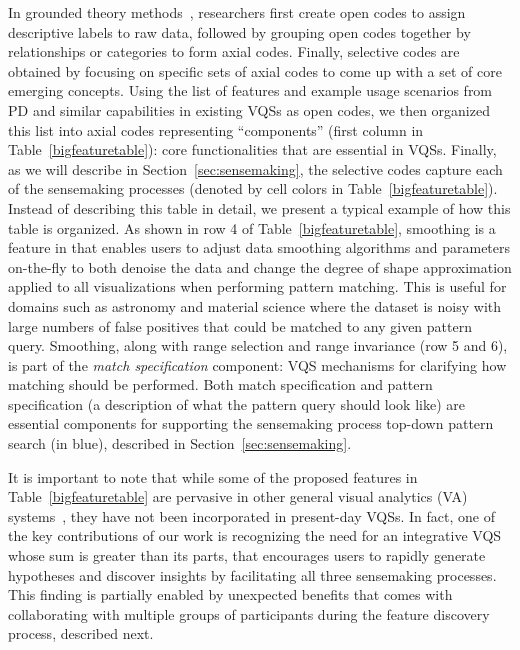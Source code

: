 {  \par In grounded theory methods~\cite{Muller2012}, researchers first create open codes to assign descriptive labels to raw data, followed by grouping open codes together by relationships or categories to form axial codes. Finally, selective codes are obtained by focusing on specific sets of axial codes to come up with a set of core emerging concepts. Using the list of features and example usage scenarios from PD and similar capabilities in existing VQSs as open codes, we then organized this list into axial codes representing ``components'' (first column in Table~\ref{bigfeaturetable}): core functionalities that are essential in VQSs. Finally, as we will describe in Section~\ref{sec:sensemaking}, the selective codes capture each of the sensemaking processes (denoted by cell colors in Table~\ref{bigfeaturetable}). Instead of describing this table in detail, we present a typical example of how this table is organized. As shown in row 4 of Table~\ref{bigfeaturetable}, smoothing is a feature in \zvpp that enables users to adjust data smoothing algorithms and parameters on-the-fly to both denoise the data and change the degree of shape approximation applied to all visualizations when performing pattern matching. This is useful for domains such as astronomy and material science where the dataset is noisy with large numbers of false positives that could be matched to any given pattern query. Smoothing, along with range selection and range invariance (row 5 and 6), is part of the \emph{match specification} component: VQS mechanisms for clarifying how matching should be performed. Both match specification and pattern specification (a description of what the pattern query should look like) are essential components for supporting the sensemaking process top-down pattern search (in blue), described in Section~\ref{sec:sensemaking}.
  \par It is important to note that while some of the proposed features in Table~\ref{bigfeaturetable} are pervasive in other general visual analytics (VA) systems~\cite{Heer2012,Amar2005}, they have not been incorporated in present-day VQSs. In fact, one of the key contributions of our work is recognizing the need for an integrative VQS whose sum is greater than its parts, that encourages users to rapidly generate hypotheses and discover insights by facilitating all three sensemaking processes. This finding is partially enabled by unexpected benefits that comes with collaborating with multiple groups of participants during the feature discovery process, described next.
}
